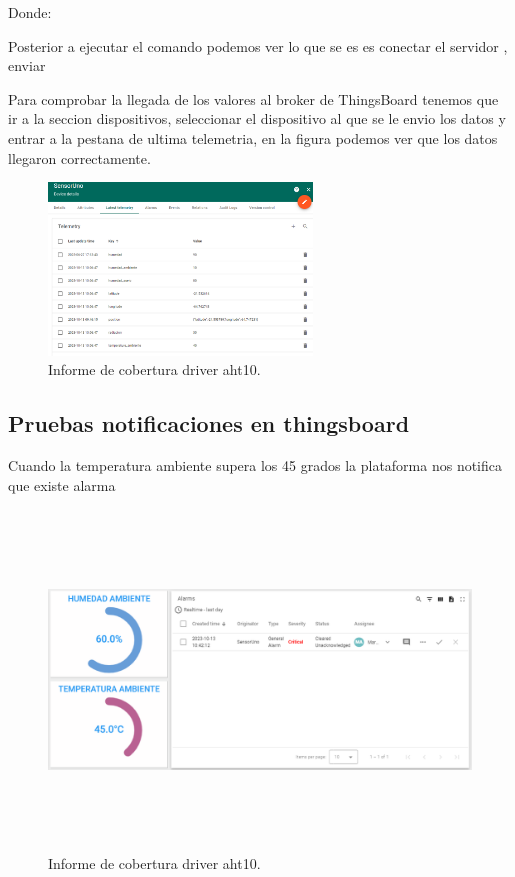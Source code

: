 Donde:

Posterior a ejecutar el comando podemos ver lo que se es es conectar el servidor , enviar 

Para comprobar la llegada de los valores al broker de ThingsBoard tenemos que ir a la seccion dispositivos, seleccionar el dispositivo al que se le envio los datos y entrar a la pestana de ultima telemetria, en la figura podemos ver que los datos llegaron correctamente.
\begin{figure}[h!]
  \centering
    \includegraphics[width=7cm, height=10cmcm]{./Figures/tb_recepcion.png}
  \caption{Informe de cobertura driver aht10.}
    \label{fig:tb recepcion}
\end{figure}
\subsection{Pruebas notificaciones en thingsboard}
Cuando la temperatura ambiente supera los 45 grados la plataforma nos notifica que existe alarma 
\begin{figure}[h!]
  \centering
    \includegraphics[width=\linewidth, height=9cm]{./Figures/alarmas_tb.png}
  \caption{Informe de cobertura driver aht10.}
    \label{fig:alarmas tb}
\end{figure}

